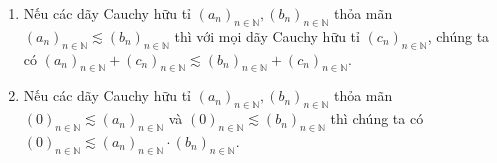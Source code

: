 \begin{theorem}\label{theorem:addition-multiplication-and-preorder-of-cauchy-sequences}
    \begin{enumerate}[label={(\roman*)}]
        \item Nếu các dãy Cauchy hữu tỉ ${(a_{n})}_{n\in\mathbb{N}}, {(b_{n})}_{n\in\mathbb{N}}$ thỏa mãn ${(a_{n})}_{n\in\mathbb{N}}\lesssim {(b_{n})}_{n\in\mathbb{N}}$ thì với mọi dãy Cauchy hữu tỉ ${(c_{n})}_{n\in\mathbb{N}}$, chúng ta có ${(a_{n})}_{n\in\mathbb{N}} + {(c_{n})}_{n\in\mathbb{N}}\lesssim {(b_{n})}_{n\in\mathbb{N}} + {(c_{n})}_{n\in\mathbb{N}}$.
        \item  Nếu các dãy Cauchy hữu tỉ ${(a_{n})}_{n\in\mathbb{N}}, {(b_{n})}_{n\in\mathbb{N}}$ thỏa mãn ${(0)}_{n\in\mathbb{N}}\lesssim {(a_{n})}_{n\in\mathbb{N}}$ và ${(0)}_{n\in\mathbb{N}}\lesssim {(b_{n})}_{n\in\mathbb{N}}$ thì chúng ta có ${(0)}_{n\in\mathbb{N}}\lesssim {(a_{n})}_{n\in\mathbb{N}}\cdot {(b_{n})}_{n\in\mathbb{N}}$.
    \end{enumerate}
\end{theorem}

